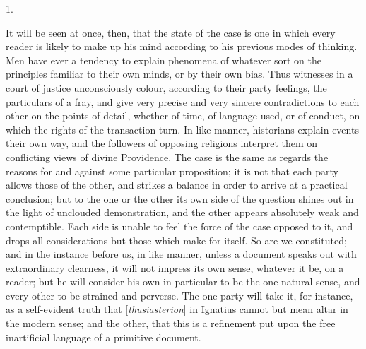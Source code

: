 1.

It will be seen at once, then, that the state of
the case is one in which every reader is likely to make up his mind
according to his previous modes of thinking. Men have ever a tendency
to explain phenomena of whatever sort on the principles familiar to
their own minds, or by their own bias. Thus witnesses in a court of
justice unconsciously colour, according to their party feelings,
the particulars of a fray, and give very precise and very sincere
contradictions to each other on the points of detail, whether of time,
of language used, or of conduct, on which the rights of the
transaction turn. In like manner, historians explain events their own
way, and the followers of opposing religions interpret them on
conflicting views of divine Providence. The case is the same as
regards the reasons for and against some particular proposition; it is
not that each party allows those of the other, and strikes a balance
in order to arrive at a practical conclusion; but to the one or the
other its own side of the question shines out in the light of
unclouded demonstration, and the other appears absolutely weak and
contemptible. Each side is unable to feel the force of the case
opposed to it, and drops all considerations but those which make for
itself. So are we constituted; and in the instance before us, in like
manner, unless a document speaks out with extraordinary clearness, it
will not impress its own sense, whatever it be, on a reader; but he
will consider his own in particular to be the one natural sense, and
every other to be strained and perverse. The one party will take it,
for instance, as a self-evident truth that [\emph{thusiast\={e}rion}]
in Ignatius cannot but mean altar in the modern sense; and the other,
that this is a refinement put upon the free inartificial language of a
primitive document.

